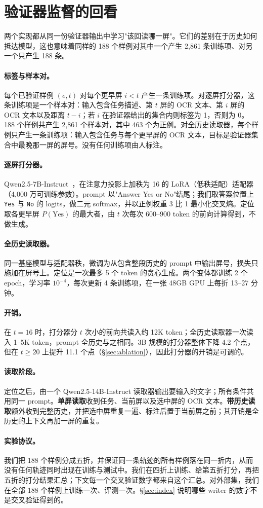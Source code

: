 \section{验证器监督的回看}
\label{sec:method}
两个实现都从同一份验证器输出中学习"该回读哪一屏"。它们的差别在于历史如何抵达模型，这也意味着同样的 188 个样例对其中一个产生 2,861 条训练项、对另一个只产生 188 条。

\paragraph{标签与样本对。} 每个已验证样例 $(e,t)$ 对每个更早屏 $i<t$ 产生一条训练项。对逐屏打分器，这条训练项是一个样本对：输入包含任务描述、第 $t$ 屏的 OCR 文本、第 $i$ 屏的 OCR 文本以及距离 $t-i$；若 $i$ 在验证器给出的集合内则标签为 1，否则为 0。188 个样例共产生 2,861 个样本对，其中 463 个为正例。对全历史读取器，每个样例只产生一条训练项：输入包含任务与每个更早屏的 OCR 文本，目标是验证器集合中最晚那一屏的屏号。没有任何训练项由人标注。

\paragraph{逐屏打分器。} Qwen2.5-7B-Instruct~\citep{qwen25}，在注意力投影上加秩为 16 的 LoRA（低秩适配）适配器（4,000 万可训练参数）。prompt 以"Answer Yes or No"结尾；我们取答案位置上 \texttt{Yes} 与 \texttt{No} 的 logits，做二元 softmax，并以正例权重 3 比 1 最小化交叉熵。定位取各更早屏 $P(\text{Yes})$ 的最大者，由 $t$ 次每次 600--900 token 的前向计算得到，不做生成。

\paragraph{全历史读取器。} 同一基座模型与适配器秩，微调为从包含整段历史的 prompt 中输出屏号，损失只施加在屏号上。定位是一次最多 5 个 token 的贪心生成。两个变体都训练 2 个 epoch，学习率 $10^{-4}$，每次更新 4 条训练项，在一张 48GB GPU 上每折 13--27 分钟。

\paragraph{开销。} 在 $t=16$ 时，打分器分 $t$ 次小的前向共读入约 12K token；全历史读取器一次读入 1--5K token，prompt 全历史与之相同。3B 规模的打分器整体下降 4.2 个点，但在 $t\ge20$ 上提升 11.1 个点（\S\ref{sec:ablation}），因此打分器的开销是可调的。

\paragraph{读取阶段。} 定位之后，由一个 Qwen2.5-14B-Instruct 读取器输出要输入的文字；所有条件共用同一 prompt。\textbf{单屏读取}收到任务、当前屏以及选中屏的 OCR 文本。\textbf{带历史读取}额外收到完整历史，并把选中屏重复一遍、标注后置于当前屏之前；其开销是全历史的上下文再加一屏的重复。

\paragraph{实验协议。} 我们把 188 个样例分成五折，并保证同一条轨迹的所有样例落在同一折内，从而没有任何轨迹同时出现在训练与测试中。我们在四折上训练、给第五折打分，再把五折的打分结果汇总；下文每一个交叉验证数字都来自这个汇总。对外部集，我们在全部 188 个样例上训练一次、评测一次。\S\ref{sec:index} 说明哪些 writer 的数字不是交叉验证得到的。
